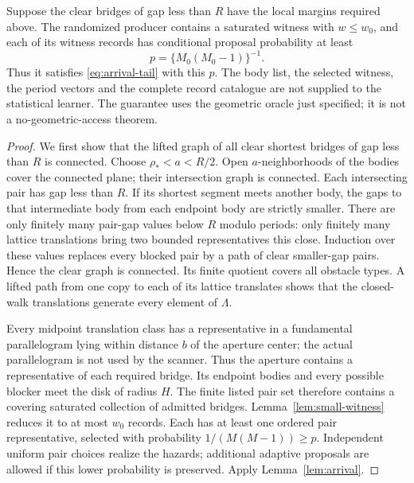 \begin{proposition}
\label{prop:geometric-producer}
Suppose the clear bridges of gap less than $R$ have the local margins
required above. The randomized producer contains a saturated witness
with $w\le w_0$, and each of its witness records has conditional proposal
probability at least
\begin{equation}\label{eq:producer-p}
                    p=\{M_0(M_0-1)\}^{-1}.
\end{equation}
Thus it satisfies \eqref{eq:arrival-tail} with this $p$. The body list,
the selected witness, the period vectors and the complete record catalogue
are not supplied to the statistical learner. The guarantee uses the
geometric oracle just specified; it is not a no-geometric-access theorem.
\end{proposition}
\begin{proof}
We first show that the lifted graph of all clear shortest bridges of gap
less than $R$ is connected. Choose $\rho_*<a<R/2$. Open $a$-neighborhoods
of the bodies cover the connected plane; their intersection graph is
connected. Each intersecting pair has gap less than $R$. If its shortest
segment meets another body, the gaps to that intermediate body from each
endpoint body are strictly smaller. There are only finitely many pair-gap
values below $R$ modulo periods: only finitely many lattice translations
bring two bounded representatives this close. Induction over these values
replaces every blocked pair by a path of clear smaller-gap pairs. Hence
the clear graph is connected. Its finite quotient covers all obstacle
types. A lifted path from one copy to each of its lattice translates
shows that the closed-walk translations generate every element of $\Lambda$.

Every midpoint translation class has a representative in a fundamental
parallelogram lying within distance $b$ of the aperture center; the actual
parallelogram is not used by the scanner. Thus the aperture contains a
representative of each required bridge. Its endpoint bodies and every
possible blocker meet the disk of radius $H$. The finite listed pair set
therefore contains a covering saturated collection of admitted bridges.
Lemma~\ref{lem:small-witness} reduces it to at most $w_0$ records.
Each has at least one ordered pair representative, selected with probability
$1/(M(M-1))\ge p$. Independent uniform pair choices realize the hazards;
additional adaptive proposals are allowed if this lower probability is
preserved. Apply Lemma~\ref{lem:arrival}.
\end{proof}

